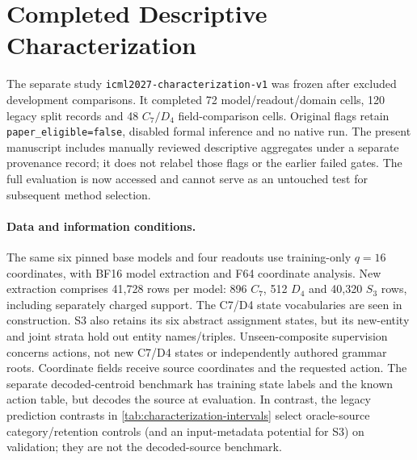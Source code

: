 \section{Completed Descriptive Characterization}
\label{app:characterization}
The separate study \texttt{icml2027-characterization-v1} was frozen after excluded development comparisons. It completed 72 model/readout/domain cells, 120 legacy split records and 48 $C_7/D_4$ field-comparison cells. Original flags retain \texttt{paper\_eligible=false}, disabled formal inference and no native run. The present manuscript includes manually reviewed descriptive aggregates under a separate provenance record; it does not relabel those flags or the earlier failed gates. The full evaluation is now accessed and cannot serve as an untouched test for subsequent method selection.

\paragraph{Data and information conditions.}
The same six pinned base models and four readouts use training-only $q=16$ coordinates, with BF16 model extraction and F64 coordinate analysis. New extraction comprises 41,728 rows per model: 896 $C_7$, 512 $D_4$ and 40,320 $S_3$ rows, including separately charged support. The C7/D4 state vocabularies are seen in construction. S3 also retains its six abstract assignment states, but its new-entity and joint strata hold out entity names/triples. Unseen-composite supervision concerns actions, not new C7/D4 states or independently authored grammar roots. Coordinate fields receive source coordinates and the requested action. The separate decoded-centroid benchmark has training state labels and the known action table, but decodes the source at evaluation. In contrast, the legacy prediction contrasts in \cref{tab:characterization-intervals} select oracle-source category/retention controls (and an input-metadata potential for S3) on validation; they are not the decoded-source benchmark.

